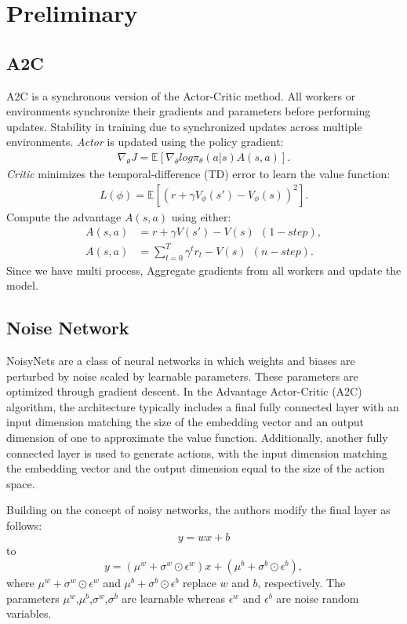 \documentclass{article}
\begin{document}
\section{Preliminary}
\subsection{A2C}
A2C is a synchronous version of the Actor-Critic method. All workers or environments synchronize their gradients and parameters before performing updates. Stability in training due to synchronized updates across multiple environments.
\textit{Actor} is updated using the policy gradient:
\begin{align*}
\nabla_{\theta}J=\mathbb{E}[\nabla_\theta log\pi_\theta(a|s)A(s,a)].
\end{align*}
\textit{Critic} minimizes the temporal-difference (TD) error to learn the value function:
\begin{align*}
L(\phi) = \mathbb{E}[(r+\gamma V_{\phi}(s')-V_{\phi}(s))^2].
\end{align*}
Compute the advantage $A(s,a)$ using either:
\begin{align*}
A(s,a) &= r+\gamma V(s') -V(s)\ \ (1-step),\\
A(s,a) &= \sum_{t=0}^T \gamma^t r_t -V(s)\ \ (n-step).
\end{align*}
Since we have multi process, Aggregate gradients from all workers and update the model.
\subsection{Noise Network}
NoisyNets are a class of neural networks in which weights and biases are perturbed by noise scaled by learnable parameters. These parameters are optimized through gradient descent. In the Advantage Actor-Critic (A2C) algorithm, the architecture typically includes a final fully connected layer with an input dimension matching the size of the embedding vector and an output dimension of one to approximate the value function. Additionally, another fully connected layer is used to generate actions, with the input dimension matching the embedding vector and the output dimension equal to the size of the action space.

Building on the concept of noisy networks, the authors modify the final layer as follows:
\[
y = wx+b
\]
to 
\[
y = (\mu^w+\sigma^w\odot \epsilon^w)x+(\mu^b+\sigma^b\odot \epsilon^b),
\]
where $\mu^w+\sigma^w\odot \epsilon^w$ and $\mu^b+\sigma^b\odot \epsilon^b$ replace $w$ and $b$, respectively. The parameters $\mu^w$,$\mu^b$,$\sigma^w$,$\sigma^b$ are learnable whereas $\epsilon^w$ and $\epsilon^b$ are noise random variables.
\end{document}
